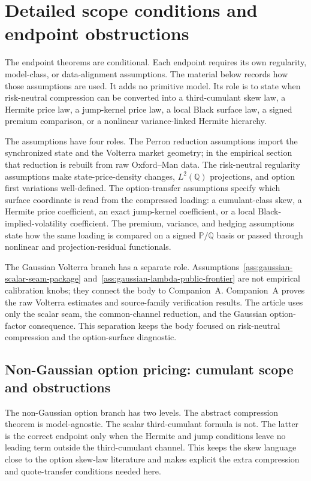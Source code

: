 \documentclass[11pt,a4paper]{amsart}
\theoremstyle{plain}
\theoremstyle{definition}
\theoremstyle{remark}
\newcommand{\PP}{\mathbb{P}}
\newcommand{\QQ}{\mathbb{Q}}
\begin{document}
\section{Detailed scope conditions and endpoint obstructions}
\label{sec:detailed-scope-gates}

The endpoint theorems are conditional.  Each endpoint requires its own regularity, model-class, or
data-alignment assumptions.  The material below records how those assumptions are used.  It adds no
primitive model.  Its role is to state when risk-neutral compression can be converted into a
third-cumulant skew law, a Hermite price law, a jump-kernel price law, a local Black surface law, a
signed premium comparison, or a nonlinear variance-linked Hermite hierarchy.

The assumptions have four roles.  The Perron reduction assumptions import the synchronized state
and the Volterra market geometry; in the empirical section that reduction is rebuilt from raw
Oxford--Man data.  The risk-neutral regularity assumptions make state-price-density changes,
\(L^2(\QQ)\) projections, and option first variations well-defined.  The option-transfer
assumptions specify which surface coordinate is read from the compressed loading: a cumulant-class
skew, a Hermite price coefficient, an exact jump-kernel coefficient, or a local
Black-implied-volatility coefficient.  The premium, variance, and hedging assumptions state how the
same loading is compared on a signed \(\PP/\QQ\) basis or passed through nonlinear and
projection-residual functionals.

The Gaussian Volterra branch has a separate role.  Assumptions~\ref{ass:gaussian-scalar-seam-package}
and~\ref{ass:gaussian-lambda-public-frontier} are not empirical calibration knobs; they connect the
body to Companion~A.  Companion~A proves the raw Volterra estimates and source-family verification
results.  The article uses only the scalar seam, the common-channel reduction, and the Gaussian
option-factor consequence.  This separation keeps the body focused on risk-neutral compression and
the option-surface diagnostic.

\subsection{Non-Gaussian option pricing: cumulant scope and obstructions}
\label{subsec:ng-option-obstructions}

The non-Gaussian option branch has two levels.  The abstract compression theorem is
model-agnostic.  The scalar third-cumulant formula is not.  The latter is the correct endpoint only
when the Hermite and jump conditions leave no leading term outside the third-cumulant channel.
This keeps the skew language close to the option skew-law literature \cite{bakshi2003} and makes
explicit the extra compression and quote-transfer conditions needed here.
\end{document}
